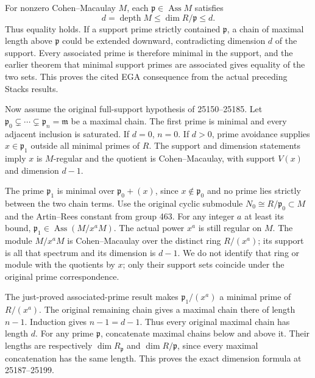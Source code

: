 For nonzero Cohen--Macaulay \(M\), each \(\mathfrak p\in\operatorname{Ass}M\) satisfies \[
 d=\operatorname{depth}M\le\dim R/\mathfrak p\le d.
\] Thus equality holds. If a support prime strictly contained \(\mathfrak p\), a chain of maximal length above \(\mathfrak p\) could be extended downward, contradicting dimension \(d\) of the support. Every associated prime is therefore minimal in the support, and the earlier theorem that minimal support primes are associated gives equality of the two sets. This proves the cited EGA consequence from the actual preceding Stacks results.

Now assume the original full-support hypothesis of 25150--25185. Let \(\mathfrak p_0\subsetneq\cdots\subsetneq\mathfrak p_n=\mathfrak m\) be a maximal chain. The first prime is minimal and every adjacent inclusion is saturated. If \(d=0\), \(n=0\). If \(d>0\), prime avoidance supplies \(x\in\mathfrak p_1\) outside all minimal primes of \(R\). The support and dimension statements imply \(x\) is \(M\)-regular and the quotient is Cohen--Macaulay, with support \(V(x)\) and dimension \(d-1\).

The prime \(\mathfrak p_1\) is minimal over \(\mathfrak p_0+(x)\), since \(x\notin\mathfrak p_0\) and no prime lies strictly between the two chain terms. Use the original cyclic submodule \(N_0\cong R/\mathfrak p_0\subset M\) and the Artin--Rees constant from group 463. For any integer \(a\) at least its bound, \(\mathfrak p_1\in\operatorname{Ass}(M/x^aM)\). The actual power \(x^a\) is still regular on \(M\). The module \(M/x^aM\) is Cohen--Macaulay over the distinct ring \(R/(x^a)\); its support is all that spectrum and its dimension is \(d-1\). We do not identify that ring or module with the quotients by \(x\); only their support sets coincide under the original prime correspondence.

The just-proved associated-prime result makes \(\mathfrak p_1/(x^a)\) a minimal prime of \(R/(x^a)\). The original remaining chain gives a maximal chain there of length \(n-1\). Induction gives \(n-1=d-1\). Thus every original maximal chain has length \(d\). For any prime \(\mathfrak p\), concatenate maximal chains below and above it. Their lengths are respectively \(\dim R_{\mathfrak p}\) and \(\dim R/\mathfrak p\), since every maximal concatenation has the same length. This proves the exact dimension formula at 25187--25199.

